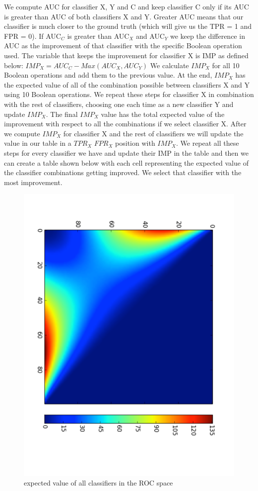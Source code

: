 We compute AUC for classifier X, Y and C and keep classifier C only if its AUC is greater than AUC of both classifiers X and Y. Greater AUC means that our classifier is much closer to the ground truth (which will give us the TPR = 1 and FPR = 0).
If AUC$_C$ is greater than AUC$_X$ and AUC$_Y$ we keep the difference in AUC as the improvement of that classifier with the specific Boolean operation used. The variable that keeps the improvement for classifier X is IMP as defined below:
$IMP_X  = AUC_C - Max(AUC_X, AUC_Y)$
We calculate $IMP_X$ for all 10 Boolean operations and add them to the previous value. At the end, $IMP_X$ has the expected value of all of the combination possible between classifiers X and Y using 10 Boolean operations. We repeat these steps for classifier X in combination with the rest of classifiers, choosing one each time as a new classifier Y and update $IMP_X$. The final $IMP_X$ value has the total expected value of the improvement with respect to all the combinations if we select classifier X. After we compute $IMP_X$ for classifier X and the rest of classifiers we will update the value in our table in a $TPR_X$ $FPR_X$ position with $IMP_X$. We repeat all these steps for every classifier we have and update their IMP in the table and then we can create a table shown below with each cell representing the expected value of the classifier combinations getting improved. We select that classifier with the most improvement.

\begin{figure}[H]
\centering
\includegraphics[scale=1]{figs/expected_value}
\caption{expected value of all classifiers in the ROC space}
\label{fig::expected_value}
\end{figure}

